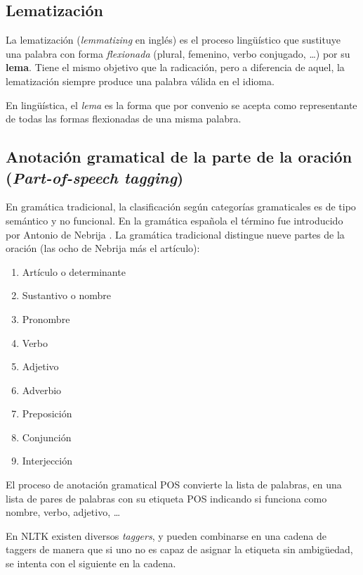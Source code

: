 \subsection{Lematización}

La lematización (\emph{lemmatizing} en inglés) es el proceso lingüístico que sustituye una palabra con forma \emph{flexionada} (plural, femenino, verbo conjugado, \ldots) por su \textbf{lema}. Tiene el mismo objetivo que la radicación, pero a diferencia de aquel, la lematización siempre produce una palabra válida en el idioma.
\begin{definition}[Lema]
En lingüística, el \emph{lema} es la forma que por convenio se acepta como representante de todas las formas flexionadas de una misma palabra.
\end{definition}

\subsection{Anotación gramatical de la parte de la oración (\emph{Part-of-speech tagging}) }

En gramática tradicional, la clasificación según categorías gramaticales es de tipo semántico y no funcional. En la gramática española el término fue introducido por Antonio de Nebrija \citep[Categoría gramatical]{wikipedia-es}. La gramática tradicional distingue nueve partes de la oración (las ocho de Nebrija más el artículo):
\nopagebreak
\begin{enumerate}
\item Artículo o determinante
\item Sustantivo o nombre
\item Pronombre
\item Verbo
\item Adjetivo
\item Adverbio
\item Preposición
\item Conjunción
\item Interjección
\end{enumerate}

El proceso de anotación gramatical POS convierte la lista de palabras, en una lista de pares de palabras con su etiqueta POS indicando si funciona como nombre, verbo, adjetivo, \ldots

En NLTK existen diversos \emph{taggers}, y pueden combinarse en una cadena de taggers de manera que si uno no es capaz de asignar la etiqueta sin ambigüedad, se intenta con el siguiente en la cadena.

